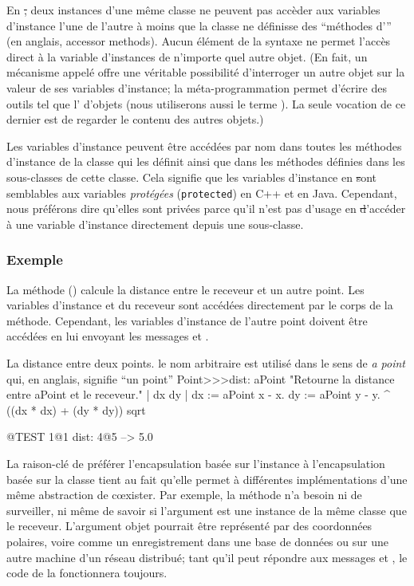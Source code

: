\documentclass[a4paper,10pt,twoside]{book}
\begin{document}
En \st, deux instances d'une même classe ne peuvent pas accèder aux variables d'instance l'une de l'autre à moins que la classe ne définisse des ``méthodes d''' (en anglais, accessor methods).
Aucun élément de la syntaxe ne permet l'accès direct à la variable d'instances de n'importe quel autre objet.
(En fait, un mécanisme appelé 
offre une véritable possibilité d'interroger un autre objet sur la valeur de ses variables d'instance; la méta-programmation permet d'écrire des outils tel que l' d'objets (nous utiliserons aussi le terme ). La seule vocation de ce dernier est de regarder le contenu des autres objets.)

Les variables d'instance peuvent être accédées par 
nom dans toutes les méthodes d'instance de la classe qui les définit
ainsi que dans les méthodes définies dans les sous-classes de cette classe.
Cela signifie que les variables d'instance en \st sont semblables aux
variables \emph{protégées} \mbox{(\texttt{protected})} en C++ et en Java. Cependant,
nous préférons dire qu'elles sont privées parce qu'il n'est pas d'usage en \st d'accéder à une variable d'instance directement depuis une sous-classe. 
\subsubsection{Exemple}
La méthode  () calcule la distance entre le receveur et un autre point. Les variables d'instance  et  du receveur sont accédées directement par le corps de la méthode. Cependant, les variables d'instance de l'autre point doivent être accédées en lui envoyant les messages  et .

\begin{method}[dist:]{La distance entre deux points. le nom arbitraire  est utilisé dans le sens de \emph{a point} qui, en anglais, signifie ``un point''}
Point>>>dist: aPoint 
	"Retourne la distance entre aPoint et le receveur."
	| dx dy |
	dx := aPoint x - x.
	dy :=  aPoint y - y.
	^ ((dx * dx) + (dy * dy)) sqrt
\end{method}

\begin{code}{@TEST}
1@1 dist: 4@5 --> 5.0
\end{code}

La raison-clé de préférer l'encapsulation basée sur l'instance
à l'encapsulation basée sur la classe tient au fait qu'elle permet
à différentes implémentations d'une même abstraction de c\oe{}xister.
Par exemple, la méthode  n'a besoin ni de surveiller, ni 
même de savoir si l'argument  est une instance de la même classe
que le receveur.  L'argument objet pourrait être représenté par des
coordonnées polaires, voire comme un enregistrement dans une base de données ou sur une autre machine d'un réseau distribué; tant qu'il peut répondre
aux messages  et , le code de la  fonctionnera toujours.
\end{document}
